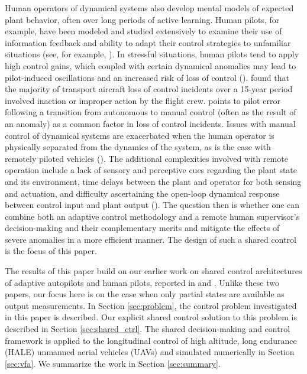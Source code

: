 \documentclass[english]{ifacconf}
\begin{document}
Human operators of dynamical systems also develop mental models of expected plant behavior, often over long periods of active learning. Human pilots, for example, have been modeled and studied extensively to examine their use of information feedback and ability to adapt their control strategies to unfamiliar situations (see, for example, \cite{mcruer1967review, phatak1969model, hess2015modeling, zaal2016manual}). In stressful situations, human pilots tend to apply high control gains, which coupled with certain dynamical anomalies may lead to pilot-induced oscillations and an increased risk of loss of control (\cite{hess1997unified}). \cite{belcastro2014preliminary} found that the majority of transport aircraft loss of control incidents over a 15-year period involved inaction or improper action by the flight crew. \cite{endsley1996automation} points to pilot error following a transition from autonomous to manual control (often as the result of an anomaly) as a common factor in loss of control incidents. Issues with manual control of dynamical systems are exacerbated when the human operator is physically separated from the dynamics of the system, as is the case with remotely piloted vehicles (\cite{mccarley2004human, tvaryanas2008recurrent}). The additional complexities involved with remote operation include a lack of sensory and perceptive cues regarding the plant state and its environment, time delays between the plant and operator for both sensing and actuation, and difficulty ascertaining the open-loop dynamical response between control input and plant output (\cite{lam2008haptic}). The question then is whether one can combine both an adaptive control methodology and a remote human supervisor's decision-making and their complementary merits and mitigate the effects of severe anomalies in a more efficient manner. The design of such a shared control is the focus of this paper.

The results of this paper build on our earlier work on shared control architectures of adaptive autopilots and human pilots, reported in \cite{farjadian2017bumpless} and \cite{thomsen2018shared}. Unlike these two papers, our focus here is on the case when only partial states are available as output measurements. In Section \ref{sec:problem}, the control problem investigated in this paper is described. Our explicit shared control solution to this problem is described in Section \ref{sec:shared_ctrl}. The shared decision-making and control framework is applied to the longitudinal control of high altitude, long endurance (HALE) unmanned aerial vehicles (UAVs) and simulated numerically in Section \ref{sec:vfa}. We summarize the work in Section \ref{sec:summary}.
\end{document}
